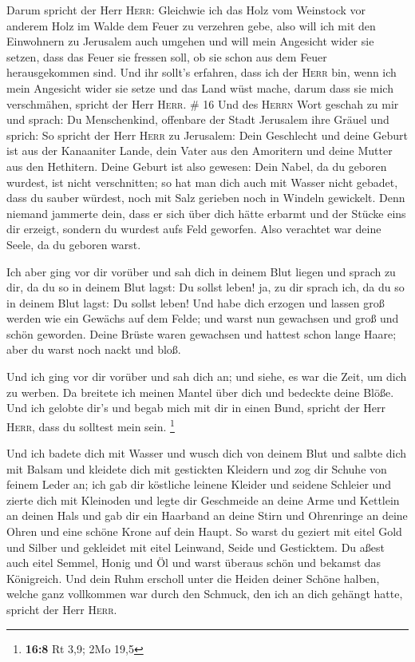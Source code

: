  Darum spricht der Herr \textsc{Herr}: Gleichwie ich das
Holz vom Weinstock vor anderem Holz im Walde dem Feuer zu verzehren
gebe, also will ich mit den Einwohnern zu Jerusalem auch umgehen
 und will mein Angesicht wider sie setzen, dass das Feuer
sie fressen soll, ob sie schon aus dem Feuer herausgekommen sind. Und
ihr sollt's erfahren, dass ich der \textsc{Herr} bin, wenn ich mein
Angesicht wider sie setze  und das Land wüst mache, darum
dass sie mich verschmähen, spricht der Herr \textsc{Herr}. \# 16
 Und des \textsc{Herrn} Wort geschah zu mir und sprach:
 Du Menschenkind, offenbare der Stadt Jerusalem ihre
Gräuel und sprich:  So spricht der Herr \textsc{Herr} zu
Jerusalem: Dein Geschlecht und deine Geburt ist aus der Kanaaniter
Lande, dein Vater aus den Amoritern und deine Mutter aus den Hethitern.
 Deine Geburt ist also gewesen: Dein Nabel, da du geboren
wurdest, ist nicht verschnitten; so hat man dich auch mit Wasser nicht
gebadet, dass du sauber würdest, noch mit Salz gerieben noch in Windeln
gewickelt.  Denn niemand jammerte dein, dass er sich über
dich hätte erbarmt und der Stücke eins dir erzeigt, sondern du wurdest
aufs Feld geworfen. Also verachtet war deine Seele, da du geboren warst.

 Ich aber ging vor dir vorüber und sah dich in deinem Blut
liegen und sprach zu dir, da du so in deinem Blut lagst: Du sollst
leben! ja, zu dir sprach ich, da du so in deinem Blut lagst: Du sollst
leben!  Und habe dich erzogen und lassen groß werden wie
ein Gewächs auf dem Felde; und warst nun gewachsen und groß und schön
geworden. Deine Brüste waren gewachsen und hattest schon lange Haare;
aber du warst noch nackt und bloß.

 Und ich ging vor dir vorüber und sah dich an; und siehe,
es war die Zeit, um dich zu werben. Da breitete ich meinen Mantel über
dich und bedeckte deine Blöße. Und ich gelobte dir's und begab mich mit
dir in einen Bund, spricht der Herr \textsc{Herr}, dass du solltest mein
sein. \footnote{\textbf{16:8} Rt 3,9; 2Mo 19,5}

 Und ich badete dich mit Wasser und wusch dich von deinem
Blut und salbte dich mit Balsam  und kleidete dich mit
gestickten Kleidern und zog dir Schuhe von feinem Leder an; ich gab dir
köstliche leinene Kleider und seidene Schleier  und
zierte dich mit Kleinoden und legte dir Geschmeide an deine Arme und
Kettlein an deinen Hals  und gab dir ein Haarband an
deine Stirn und Ohrenringe an deine Ohren und eine schöne Krone auf dein
Haupt.  So warst du geziert mit eitel Gold und Silber und
gekleidet mit eitel Leinwand, Seide und Gesticktem. Du aßest auch eitel
Semmel, Honig und Öl und warst überaus schön und bekamst das Königreich.
 Und dein Ruhm erscholl unter die Heiden deiner Schöne
halben, welche ganz vollkommen war durch den Schmuck, den ich an dich
gehängt hatte, spricht der Herr \textsc{Herr}.

